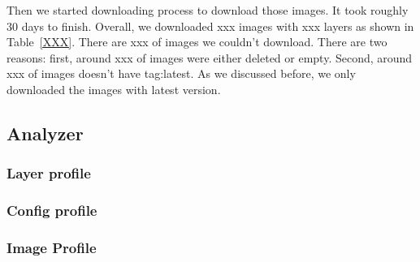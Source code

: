 Then we started downloading process to download those images. It took roughly 30 days to finish. Overall, we downloaded xxx images with xxx layers as shown in Table~\ref{XXX}. There are xxx of images we couldn't download. There are two reasons: first, around xxx of images were either deleted or empty. Second, around xxx of images doesn't have tag:latest. As we discussed before, we only downloaded the images with latest version.

%
%

\subsection{Analyzer}

\subsubsection{Layer profile}

\subsubsection{Config profile}

\subsubsection{Image Profile}